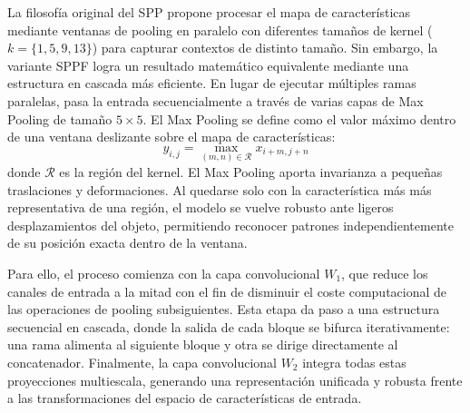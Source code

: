 \documentclass{article}
\begin{document}
La filosofía original del SPP \cite{He_2014} propone procesar el mapa de características mediante ventanas de pooling en paralelo con diferentes tamaños de kernel ($k=\{1, 5, 9, 13\}$) para capturar contextos de distinto tamaño. Sin embargo, la variante SPPF logra un resultado matemático equivalente mediante una estructura en cascada más eficiente. En lugar de ejecutar múltiples ramas paralelas, pasa la entrada secuencialmente a través de varias capas de Max Pooling de tamaño $5\times5$. El Max Pooling se define como el valor máximo dentro de una ventana deslizante sobre el mapa de características:
\begin{equation}
	y_{i,j} = \max_{(m,n) \in \mathcal{R}} x_{i+m, j+n}
\end{equation}
donde $\mathcal{R}$ es la región del kernel. El Max Pooling aporta invarianza a pequeñas traslaciones y deformaciones. Al quedarse solo con la característica más más representativa de una región, el modelo se vuelve robusto ante ligeros desplazamientos del objeto, permitiendo reconocer patrones independientemente de su posición exacta dentro de la ventana.


Para ello, el proceso comienza con la capa convolucional $W_1$, que reduce los canales de entrada a la mitad con el fin de disminuir el coste computacional de las operaciones de pooling subsiguientes. Esta etapa da paso a una estructura secuencial en cascada, donde la salida de cada bloque se bifurca iterativamente: una rama alimenta al siguiente bloque y otra se dirige directamente al concatenador. Finalmente, la capa convolucional $W_2$ integra todas estas proyecciones multiescala, generando una representación unificada y robusta frente a las transformaciones del espacio de características de entrada.
\end{document}
